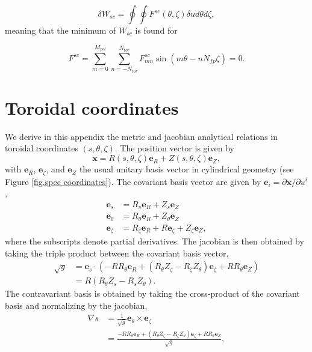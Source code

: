 \begin{equation}
	\delta W_{sc} = \oint\oint F^{sc}(\theta,\zeta) \delta u d\theta d\zeta,
\end{equation}
meaning that the minimum of $W_{sc}$ is found for 

\begin{equation}
	F^{sc} = \sum_{m=0}^{M_{pol}} \sum_{n=-N_{tor}}^{N_{tor}} F^{sc}_{mn} \sin(m\theta-nN_{fp}\zeta) = 0. \label{eq. spectral constraint}
\end{equation}


\chapter{Toroidal coordinates} \label{app. toroidal coordinates}
We derive in this appendix the metric and jacobian analytical relations in toroidal coordinates $(s,\theta,\zeta)$. The position vector is given by
\begin{equation}
	\mathbf{x}=R(s,\theta,\zeta)\mathbf{e}_R+Z(s,\theta,\zeta)\mathbf{e}_Z,
\end{equation}
with $\mathbf{e}_R$, $\mathbf{e}_\zeta$, and $\mathbf{e}_Z$ the usual unitary basis vector in cylindrical geometry (see Figure \ref{fig.spec coordinates}). The covariant basis vector are given by $\mathbf{e}_i=\partial\mathbf{x}/\partial u^i$, 
\begin{align}
	\mathbf{e}_s &= R_s\mathbf{e}_R+Z_s\mathbf{e}_Z\\
	\mathbf{e}_\theta &= R_\theta\mathbf{e}_R+Z_\theta\mathbf{e}_Z\\
	\mathbf{e}_\zeta &= R_\zeta\mathbf{e}_R+R\mathbf{e}_\zeta +Z_\zeta\mathbf{e}_Z,
\end{align}
where the subscripts denote partial derivatives. The jacobian is then obtained by taking the triple product between the covariant basis vector, 
\begin{align}
	\sqrt{g}&=\mathbf{e}_s\cdot (-RR_\theta\mathbf{e}_R + (R_\theta Z_\zeta-R_\zeta Z_\theta)\mathbf{e}_\zeta + RR_\theta\mathbf{e}_Z)\\
	&= R(R_\theta Z_s - R_s Z_\theta).
\end{align}
The contravariant basis is obtained by taking the cross-product of the covariant basis and normalizing by the jacobian,
\begin{align}
	\nabla s &= \frac{1}{\sqrt{g}} \mathbf{e}_\theta\times\mathbf{e}_\zeta \\
	&= \frac{-RR_\theta\mathbf{e}_R + (R_\theta Z_\zeta-R_\zeta Z_\theta)\mathbf{e}_\zeta + RR_\theta\mathbf{e}_Z}{\sqrt{g}},
\end{align}
